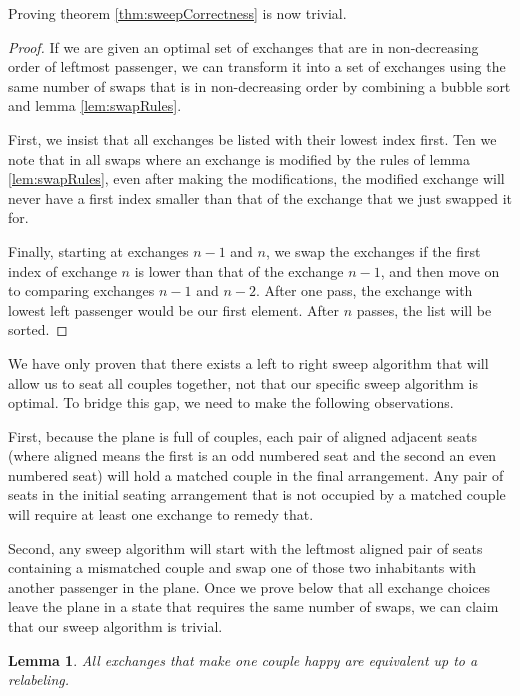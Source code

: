 \documentclass[a4paper]{article}
\newtheorem{lem}{Lemma}[section]
\begin{document}
Proving theorem \ref{thm:sweepCorrectness} is now trivial.

\begin{proof}
If we are given an optimal set of exchanges that are in non-decreasing order of leftmost passenger, we can transform it into a set of exchanges using the same number of swaps that is in non-decreasing order by combining a bubble sort and lemma \ref{lem:swapRules}.

First, we insist that all exchanges be listed with their lowest index first.  Ten we note that in all swaps where an exchange is modified by the rules of lemma \ref{lem:swapRules}, even after making the modifications, the modified exchange will never have a first index smaller than that of the exchange that we just swapped it for.

Finally, starting at exchanges $n-1$ and $n$, we swap the exchanges if the first index of exchange $n$ is lower than that of the exchange $n-1$, and then move on to comparing exchanges $n-1$ and $n-2$.  After one pass, the exchange with lowest left passenger would be our first element. After $n$ passes, the list will be sorted.
\end{proof}

We have only proven that there exists a left to right sweep algorithm that will allow us to seat all couples together, not that our specific sweep algorithm is optimal.  To bridge this gap, we need to make the following observations.

First, because the plane is full of couples, each pair of aligned adjacent seats (where aligned means the first is an odd numbered seat and the second an even numbered seat) will hold a matched couple in the final arrangement.  Any pair of seats in the initial seating arrangement that is not occupied by a matched couple will require at least one exchange to remedy that.

Second, any sweep algorithm will start with the leftmost aligned pair of seats containing a mismatched couple and swap one of those two inhabitants with another passenger in the plane.  Once we prove below that all exchange choices leave the plane in a state that requires the same number of swaps, we can claim that our sweep algorithm is trivial.

\begin{lem} \label{lem:identicalToRelabel}
All exchanges that make one couple happy are equivalent up to a relabeling.
\end{lem}
\end{document}
